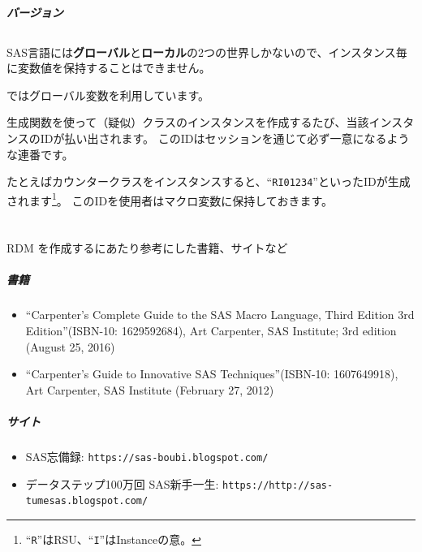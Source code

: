 \paragraph{\RDM バージョン}
 
\section{\DocStrTitleRDMTrickOfQOOP}
SAS言語には{\bfseries グローバル}と{\bfseries ローカル}の2つの世界しかないので、インスタンス毎に変数値を保持することはできません。
 
\RDM ではグローバル変数を利用しています。
 
生成関数を使って（疑似）クラスのインスタンスを作成するたび、当該インスタンスのIDが払い出されます。
このIDはセッションを通じて必ず一意になるような連番です。
 
たとえばカウンタークラスをインスタンスすると、``\texttt{RI01234}''といったIDが生成されます\footnote{``\texttt{R}''はRSU、``\texttt{I}''はInstanceの意。}。
このIDを使用者はマクロ変数に保持しておきます。
 
\section{\DocStrTitleRDMUsageOfQOOP}
 
 
\chapter{\DocStrTitleLinks}
RDM を作成するにあたり参考にした書籍、サイトなど
\paragraph{書籍}
\begin{itemize}
	\item ``Carpenter's Complete Guide to the SAS Macro Language, Third Edition 3rd Edition''(ISBN-10: 1629592684), Art Carpenter, SAS Institute; 3rd edition (August 25, 2016)
	\item ``Carpenter's Guide to Innovative SAS Techniques''(ISBN-10: 1607649918), Art Carpenter, SAS Institute (February 27, 2012)
\end{itemize}
 
\paragraph{サイト}
\begin{itemize}
	\item SAS忘備録: \texttt{https://sas-boubi.blogspot.com/}
	\item データステップ100万回 SAS新手一生: \texttt{https://http://sas-tumesas.blogspot.com/}
\end{itemize}
